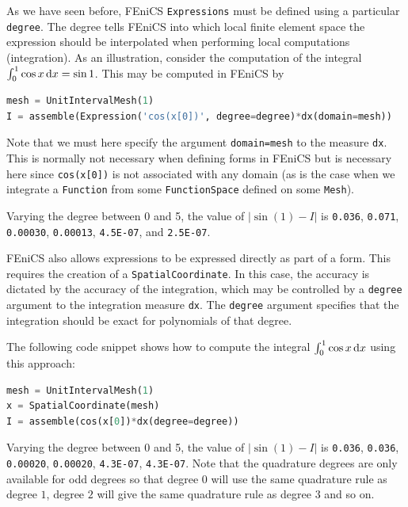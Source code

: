 \documentclass[graybox,envcountchap,sectrefs,final]{svmonodo}
\newenvironment{notice_mdfboxadmon}[1][]{
\begin{notice_mdfboxmdframed}[frametitle=#1]
}
{
\end{notice_mdfboxmdframed}
}
\begin{document}
\begin{notice_mdfboxadmon}
As we have seen before, FEniCS \texttt{Expressions} must be defined using
a particular \texttt{degree}. The degree tells FEniCS into which local
finite element space the expression should be interpolated when
performing local computations (integration). As an illustration,
consider the computation of the integral $\int_0^1 \cos x \, \mathrm{d}x = \sin
1$. This may be computed in FEniCS by
\begin{lstlisting}[language=Python,style=graycolor]
mesh = UnitIntervalMesh(1)
I = assemble(Expression('cos(x[0])', degree=degree)*dx(domain=mesh))
\end{lstlisting}
Note that we must here specify the argument \texttt{domain=mesh} to the
measure \texttt{dx}. This is normally not necessary when defining forms
in FEniCS but is necessary here since \texttt{cos(x[0])} is not associated
with any domain (as is the case when we integrate a \texttt{Function}
from some \texttt{FunctionSpace} defined on some \texttt{Mesh}).

Varying the degree between 0 and 5, the value of $|\sin(1) - I|$ is
\texttt{0.036},
\texttt{0.071},
\texttt{0.00030},
\texttt{0.00013},
\texttt{4.5E-07}, and
\texttt{2.5E-07}.

FEniCS also allows expressions to be expressed directly as part of
a form. This requires the creation of a \texttt{SpatialCoordinate}.
In this case, the accuracy is dictated by the accuracy of the
integration, which may be controlled by a \texttt{degree} argument to
the integration measure \texttt{dx}. The \texttt{degree} argument specifies
that the integration should be exact for polynomials of that degree.

The following code snippet shows
how to compute the integral $\int_0^1 \cos x \, \mathrm{d}x$ using this approach:
\begin{lstlisting}[language=Python,style=graycolor]
mesh = UnitIntervalMesh(1)
x = SpatialCoordinate(mesh)
I = assemble(cos(x[0])*dx(degree=degree))
\end{lstlisting}
Varying the degree between 0 and 5, the value of $|\sin(1) - I|$ is
\texttt{0.036},
\texttt{0.036},
\texttt{0.00020},
\texttt{0.00020},
\texttt{4.3E-07},
\texttt{4.3E-07}.
Note that the quadrature degrees are only available for
odd degrees so that degree $0$ will use the same quadrature
rule as degree $1$,
degree $2$ will give the same quadrature rule as degree $3$ and so on.
\end{notice_mdfboxadmon} %
\end{document}
